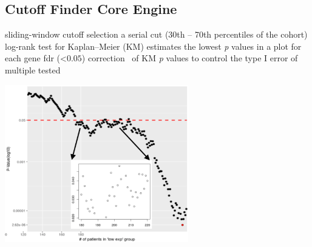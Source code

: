 \documentclass[
paper=landscape,
paper=160mm:90mm, %
fontsize=11pt, %
pagesize, %
parskip=half-, %
]{scrartcl} %
\theoremstyle{mythmstyle} %
\begin{document}
\begin{figure}
\begin{minipage}[c]{0.5\linewidth}

\end{minipage}
\end{figure}

\clearpage


\thispagestyle{headings}

\subsection{Cutoff Finder Core Engine}
\begin{minipage}[c]{0.45\linewidth}


\large
\begin{outline}
\1 sliding-window cutoff selection
    \2 a serial cut (30th -- 70th percentiles of the cohort)
    \2 log-rank test for Kaplan--Meier (KM) estimates
    \2 the lowest \textit{p} values in a plot for each gene
\1  \acrfull{fdr} (<$0.05$) correction~\cite{Benjamini1995a} of KM \textit{p} values
    \2 to control the type I error of multiple tested 
\end{outline}
\end{minipage}
\begin{minipage}[c]{0.35\linewidth}
\includegraphics[width=8cm]{Rplot_pvaluePlot_NDFIP1.pdf}
\end{minipage}
\end{document}
